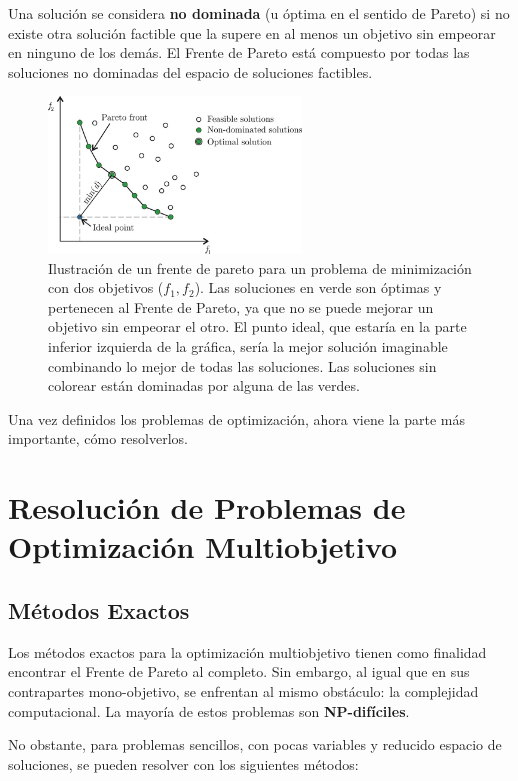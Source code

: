 \documentclass[12pt,a4paper]{book}
\begin{document}
Una solución se considera \textbf{no dominada} (u óptima en el sentido de Pareto) si no existe otra solución factible que la supere en al menos un objetivo sin empeorar en ninguno de los demás. El Frente de Pareto está compuesto por todas las soluciones no dominadas del espacio de soluciones factibles.
\begin{figure}[H]
    \centering
    \includegraphics[width=0.6\textwidth]{images/pareto_front.png}
    \caption{\cite{Bre2017} Ilustración de un frente de pareto para un problema de minimización con dos objetivos ($f_1, f_2$). Las soluciones en verde son óptimas y pertenecen al Frente de Pareto, ya que no se puede mejorar un objetivo sin empeorar el otro. El punto ideal, que estaría en la parte inferior izquierda de la gráfica, sería la mejor solución imaginable combinando lo mejor de todas las soluciones. Las soluciones sin colorear están dominadas por alguna de las verdes.}
    \label{fig:pareto}
\end{figure}

Una vez definidos los problemas de optimización, ahora viene la parte más importante, cómo resolverlos.

\section{Resolución de Problemas de Optimización Multiobjetivo}

\subsection{Métodos Exactos}

Los métodos exactos para la optimización multiobjetivo tienen como finalidad encontrar el Frente de Pareto al completo. Sin embargo, al igual que en sus contrapartes mono-objetivo, se enfrentan al mismo obstáculo: la complejidad computacional. La mayoría de estos problemas son \textbf{NP-difíciles}.

No obstante, para problemas sencillos, con pocas variables y reducido espacio de soluciones, se pueden resolver con los siguientes métodos:
\end{document}
